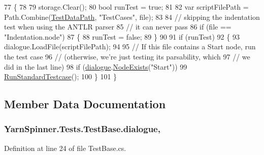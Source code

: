 \begin{DoxyCode}
77                                              \{
78 
79             storage.Clear();
80             \textcolor{keywordtype}{bool} runTest = \textcolor{keyword}{true};
81 
82             var scriptFilePath = Path.Combine(\hyperlink{a00152_aa9b4d902d61adad7165154a265f69aa4}{TestDataPath}, \textcolor{stringliteral}{"TestCases"}, file);
83 
84             \textcolor{comment}{// skipping the indentation test when using the ANTLR parser}
85             \textcolor{comment}{// it can never pass}
86             \textcolor{keywordflow}{if} (file == \textcolor{stringliteral}{"Indentation.node"})
87             \{
88                 runTest = \textcolor{keyword}{false};
89             \}
90 
91             \textcolor{keywordflow}{if} (runTest)
92             \{
93                 dialogue.LoadFile(scriptFilePath);
94 
95                 \textcolor{comment}{// If this file contains a Start node, run the test case}
96                 \textcolor{comment}{// (otherwise, we're just testing its parsability, which}
97                 \textcolor{comment}{// we did in the last line)}
98                 \textcolor{keywordflow}{if} (\hyperlink{a00152_a4cff5de56c4b8a91c76b6eb2d622a795}{dialogue}.\hyperlink{a00088_a93bb76a1f9a4058f225ff4cee97483c6}{NodeExists}(\textcolor{stringliteral}{"Start"}))
99                     \hyperlink{a00152_abffa134d40d72b21e6b35c3bf05fc53f}{RunStandardTestcase}();
100             \}
101         \}
\end{DoxyCode}


\subsection{Member Data Documentation}
\hypertarget{a00152_a4cff5de56c4b8a91c76b6eb2d622a795}{
\subsubsection[{dialogue}]{ Yarn\-Spinner.\-Tests.\-Test\-Base.\-dialogue\hspace{0.3cm}{\ttfamily [protected]}, {\ttfamily [inherited]}}}\label{a00152_a4cff5de56c4b8a91c76b6eb2d622a795}


Definition at line 24 of file Test\-Base.\-cs.

